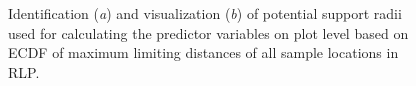 \begin{figure}[h]
	\begin{subfigure}[t]{0.5\textwidth}
		\centering
		\caption{} \label{fig:sf1}
	\end{subfigure}
	\begin{subfigure}[t]{0.5\textwidth}
		\centering
		\caption{} \label{fig:sf2}
	\end{subfigure}
     \caption{Identification (\textit{a}) and visualization (\textit{b}) of potential support radii used for calculating the predictor variables on plot level based on ECDF of maximum limiting distances of all \bwi{} sample locations in RLP.}
      \label{fig:tspec_supps}
\end{figure}

